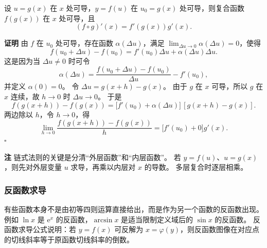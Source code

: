 \documentclass[fontset=fandol]{ctexart}
\newenvironment{proofdetail}{\par\noindent\textbf{证明}\quad}{\hfill$\square$\par\vspace{0.8em}}
\newenvironment{remark}{\par\noindent\textbf{注}\quad}{\par\vspace{0.8em}}
\newcommand{\dd}{\mathrm{d}}
\newcommand{\ee}{\mathrm{e}}
\begin{document}
\begin{theorem}[复合函数求导法则]
设 $u=g(x)$ 在 $x$ 处可导，$y=f(u)$ 在 $u_0=g(x)$ 处可导，则复合函数 $f(g(x))$ 在 $x$ 处可导，且
\[
(f\circ g)'(x)=f'(g(x))g'(x).
\]
\end{theorem}
\begin{proofdetail}
由 $f$ 在 $u_0$ 处可导，存在函数 $\alpha(\Delta u)$，满足 $\lim_{\Delta u\to0}\alpha(\Delta u)=0$，使得
\[
f(u_0+\Delta u)-f(u_0)=f'(u_0)\Delta u+\alpha(\Delta u)\Delta u.
\]
这是因为当 $\Delta u\neq0$ 时可令
\[
\alpha(\Delta u)=\frac{f(u_0+\Delta u)-f(u_0)}{\Delta u}-f'(u_0),
\]
并定义 $\alpha(0)=0$。 令 $\Delta u=g(x+h)-g(x)$。 由于 $g$ 在 $x$ 可导，所以 $g$ 在 $x$ 连续，故 $h\to0$ 时 $\Delta u\to0$。 于是
\[
f(g(x+h))-f(g(x))
=\bigl[f'(u_0)+\alpha(\Delta u)\bigr]\,[g(x+h)-g(x)].
\]
两边除以 $h$，令 $h\to0$，得
\[
\lim_{h\to0}\frac{f(g(x+h))-f(g(x))}{h}
=\bigl[f'(u_0)+0\bigr]g'(x).
\]
\end{proofdetail}

\begin{center}
\end{center}

\begin{remark}
链式法则的关键是分清“外层函数”和“内层函数”。 若 $y=f(u)$、$u=g(x)$，则先对外层变量 $u$ 求导，再乘以内层对 $x$ 的导数。 多层复合时逐层相乘。
\end{remark}





\subsubsection*{反函数求导}

有些函数本身不是由初等四则运算直接给出，而是作为另一个函数的反函数出现。 例如 $\ln x$ 是 $\ee^x$ 的反函数，$\arcsin x$ 是适当限制定义域后的 $\sin x$ 的反函数。 反函数求导公式说明：若 $y=f(x)$ 可反解为 $x=\varphi(y)$，则反函数图像在对应点的切线斜率等于原函数切线斜率的倒数。
\end{document}
